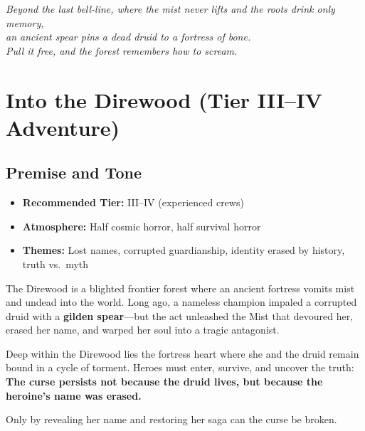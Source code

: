 \documentclass[11pt]{article}
\begin{document}


\thispagestyle{empty}

\begin{tcolorbox}[breakable]
\centering
\emph{Beyond the last bell-line, where the mist never lifts and the roots drink only memory,\\
an ancient spear pins a dead druid to a fortress of bone.\\
Pull it free, and the forest remembers how to scream.}
\end{tcolorbox}

\clearpage
\tableofcontents
\clearpage



\section{Into the Direwood (Tier III--IV Adventure)}
\label{sec:into-direwood}

\subsection*{Premise and Tone}

\begin{itemize}
  \item \textbf{Recommended Tier:} III--IV (experienced crews)
  \item \textbf{Atmosphere:} Half cosmic horror, half survival horror
  \item \textbf{Themes:} Lost names, corrupted guardianship, identity erased by history, truth vs.\ myth
\end{itemize}

The Direwood is a blighted frontier forest where an ancient fortress vomits mist and undead into the world. Long ago, a nameless champion impaled a corrupted druid with a \textbf{gilden spear}---but the act unleashed the Mist that devoured her, erased her name, and warped her soul into a tragic antagonist.

Deep within the Direwood lies the fortress heart where she and the druid remain bound in a cycle of torment. Heroes must enter, survive, and uncover the truth:  
\textbf{The curse persists not because the druid lives, but because the heroine's name was erased.}

Only by revealing her name and restoring her saga can the curse be broken.

\end{document}
